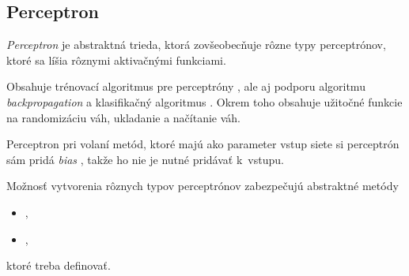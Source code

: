 \subsection{Perceptron} \label{sect:perceptron}
\textit{Perceptron} je abstraktná trieda, ktorá zovšeobecňuje rôzne typy perceptrónov, ktoré sa líšia rôznymi aktivačnými funkciami.

Obsahuje trénovací algoritmus pre perceptróny
, ale aj podporu algoritmu \textit{backpropagation} 
a klasifikačný algoritmus 
. Okrem toho obsahuje užitočné funkcie na randomizáciu váh, ukladanie a načítanie váh.

Perceptron pri volaní metód, ktoré majú ako parameter vstup siete si perceptrón sám pridá \textit{bias}
, takže ho nie je nutné pridávať k~vstupu.

Možnosť vytvorenia rôznych typov perceptrónov zabezpečujú abstraktné metódy 
\begin{itemize}
\item {},
\item {},
\end{itemize}
ktoré treba definovať.

